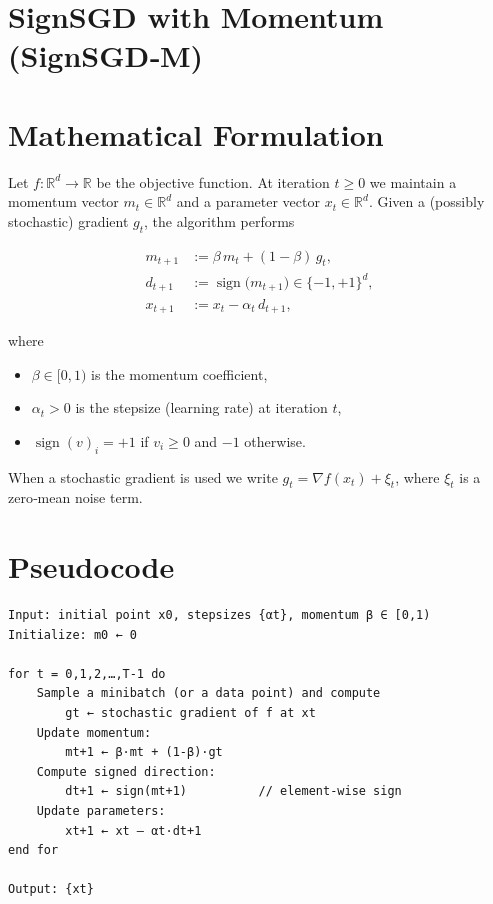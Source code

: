 \documentclass{article}
\newcommand{\R}{\mathbb{R}}
\begin{document}
\section*{SignSGD with Momentum (SignSGD‑M)}

\section*{Mathematical Formulation}
Let $f:\R^{d}\rightarrow\R$ be the objective function.  
At iteration $t\ge 0$ we maintain a momentum vector $m_t\in\R^{d}$ and a parameter vector $x_t\in\R^{d}$.  
Given a (possibly stochastic) gradient $g_t$, the algorithm performs

\[
\boxed{
\begin{aligned}
m_{t+1} &:= \beta\, m_{t} + (1-\beta)\, g_{t},\\[4pt]
d_{t+1} &:= \operatorname{sign}\!\big(m_{t+1}\big)\in\{-1,+1\}^{d},\\[4pt]
x_{t+1} &:= x_{t} - \alpha_{t}\, d_{t+1},
\end{aligned}}
\tag{1}
\]

where  

\begin{itemize}[nosep]
\item $\beta\in[0,1)$ is the momentum coefficient,
\item $\alpha_{t}>0$ is the stepsize (learning rate) at iteration $t$,
\item $\operatorname{sign}(v)_i = +1$ if $v_i\ge 0$ and $-1$ otherwise.
\end{itemize}
When a stochastic gradient is used we write $g_{t}= \nabla f(x_t)+\xi_t$, where $\xi_t$ is a zero‑mean noise term.

\section*{Pseudocode}
\begin{verbatim}
Input: initial point x0, stepsizes {αt}, momentum β ∈ [0,1)
Initialize: m0 ← 0

for t = 0,1,2,…,T‑1 do
    Sample a minibatch (or a data point) and compute
        gt ← stochastic gradient of f at xt
    Update momentum:
        mt+1 ← β·mt + (1‑β)·gt
    Compute signed direction:
        dt+1 ← sign(mt+1)          // element‑wise sign
    Update parameters:
        xt+1 ← xt – αt·dt+1
end for

Output: {xt}
\end{verbatim}
\end{document}
